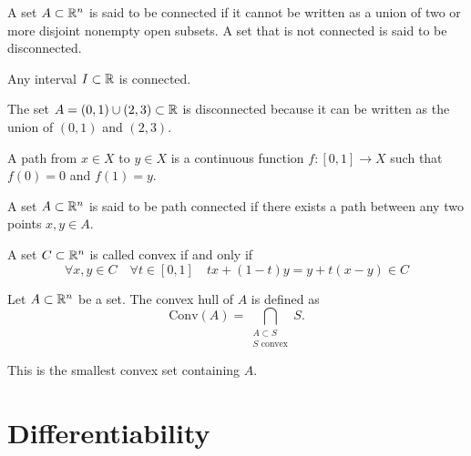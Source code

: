 \documentclass[11pt,a4paper]{article}
\begin{document}
\begin{definition}[Connectedness]
  A set $A \subset \mathbb{R}^n$ is said to be connected if it cannot be
  written as a union of two or more disjoint nonempty open subsets.
  A set that is not connected is said to be disconnected.
\end{definition}

\begin{example}
  Any interval $I \subset \mathbb{R}$ is connected.
\end{example}

\begin{example}
  The set $A = (0,1) \cup (2,3) \subset \mathbb{R}$ is disconnected because
  it can be written as the union of $(0,1)$ and $(2,3)$.
\end{example}

\begin{definition}[Path]
  A path from $x \in X$ to $y \in X$ is a continuous function 
  $f \colon [0,1] \to X$ such that $f(0) = 0$ and $f(1) = y$.
\end{definition}

\begin{definition}
  A set $A \subset \mathbb{R}^n$ is said to be path connected if there exists a path
  between any two points $x,y \in A$.
\end{definition}

\begin{definition}
  A set $C \subset \mathbb{R}^n$ is called convex if and only if
  \[
    \forall x,y \in C \quad \forall t \in [0,1] \quad
    tx + (1-t)y = y + t(x-y) \in C
  \]
\end{definition}

\begin{definition}
  Let $A \subset \mathbb{R}^n$ be a set.
  The convex hull of $A$ is defined as
  \[
    \mathrm{Conv}(A) = 
    \bigcap_{\substack{A \subset S \\ S \text{ convex}}} S.
  \]
\end{definition}
\begin{remark}
  This is the smallest convex set containing $A$.
\end{remark}

\newpage


\newpage

\section{Differentiability}
\end{document}

